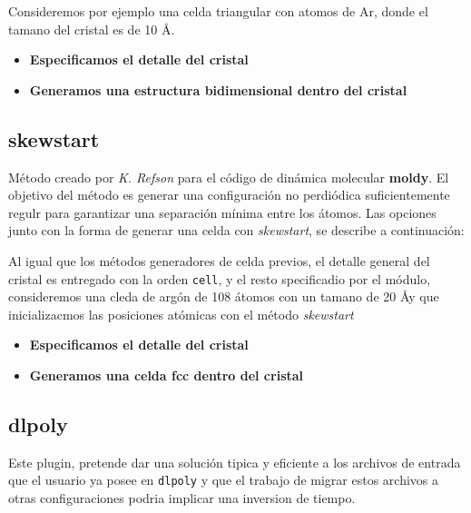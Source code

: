 Consideremos por ejemplo una celda triangular con atomos de Ar, donde el tamano del cristal es de 10 \AA.

\begin{itemize}
 \item \textbf{Especificamos el detalle del cristal}
 \item \textbf{Generamos una estructura bidimensional dentro del cristal}
\end{itemize}

\subsection{skewstart}
M\'etodo creado por \textit{K. Refson} para el c\'odigo de din\'amica molecular \textbf{moldy}. El objetivo del m\'etodo es generar una configuraci\'on no perdi\'odica suficientemente regulr para garantizar una separaci\'on m\'inima entre los \'atomos. Las opciones junto con la forma de generar una celda con \textit{skewstart}, se describe a continuaci\'on:


Al igual que los m\'etodos generadores de celda previos, el detalle general del cristal es entregado con la orden \verb|cell|, y el resto specificadio por el m\'odulo, consideremos una cleda de arg\'on de 108 \'atomos con un tamano de 20 \AA y que inicializacmos las posiciones at\'omicas con el m\'etodo \textit{skewstart}

\begin{itemize}
 \item \textbf{Especificamos el detalle del cristal}
 \item \textbf{Generamos una celda  fcc dentro del cristal}
\end{itemize}

\subsection{dlpoly}
Este plugin, pretende dar una soluci\'on tipica y eficiente a los archivos de entrada que el usuario ya posee en \verb|dlpoly| y que el trabajo de migrar estos archivos a otras configuraciones podria implicar una inversion de tiempo.

